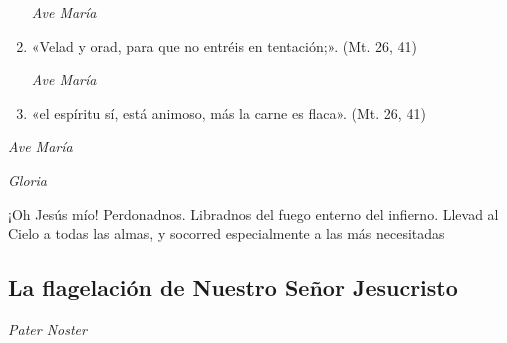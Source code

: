 \documentclass[a4paper,11pt, oneside]{report}
\begin{document}
\begin{enumerate}
          \textit{Ave María}

          \item «Velad y orad, para que no entréis en tentación;». (Mt. 26, 41)

          \textit{Ave María}

          \item «el espíritu sí, está animoso, más la carne es flaca». (Mt. 26, 41)

        \end{enumerate}

        \textit{Ave María} \par
        \indent\textit{Gloria} \par
        \indent¡Oh Jesús mío! Perdonadnos. Libradnos del fuego enterno del infierno. Llevad al Cielo a todas las almas, y socorred especialmente a las más 
        necesitadas

      \subsection*{La flagelación de Nuestro Señor Jesucristo}
      
        \textit{Pater Noster}
\end{document}
